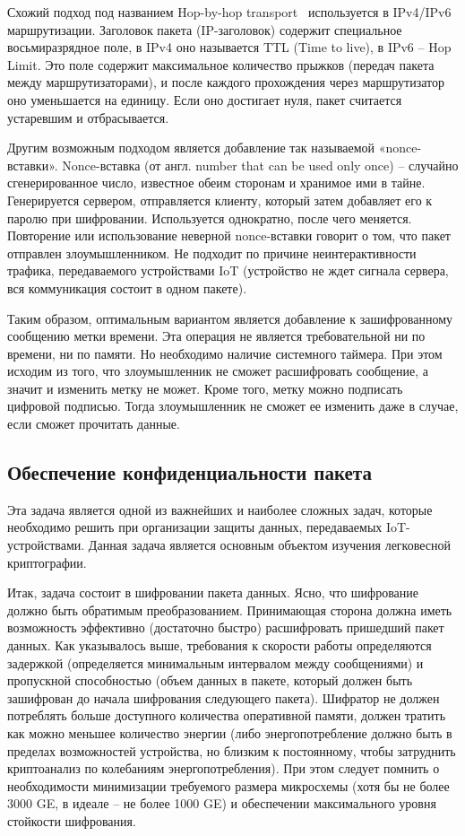Схожий подход под названием Hop-by-hop transport~\cite{src29} используется в IPv4/IPv6 маршрутизации. Заголовок пакета (IP-заголовок) содержит специальное восьмиразрядное поле, в IPv4 оно называется TTL (Time to live), в IPv6 – Hop Limit. Это поле содержит максимальное количество прыжков (передач пакета между маршрутизаторами), и после каждого прохождения через маршрутизатор оно уменьшается на единицу. Если оно достигает нуля, пакет считается устаревшим и отбрасывается.

Другим возможным подходом является добавление так называемой «nonce-вставки». Nonce-вставка (от англ. number that can be used only once) – случайно сгенерированное число, известное обеим сторонам и хранимое ими в тайне. Генерируется сервером, отправляется клиенту, который затем добавляет его к паролю при шифровании. Используется однократно, после чего меняется. Повторение или использование неверной nonce-вставки говорит о том, что пакет отправлен злоумышленником. Не подходит по причине неинтерактивности трафика, передаваемого устройствами IoT (устройство не ждет сигнала сервера, вся коммуникация состоит в одном пакете).

Таким образом, оптимальным вариантом является добавление к зашифрованному сообщению метки времени. Эта операция не является требовательной ни по времени, ни по памяти. Но необходимо наличие системного таймера. При этом исходим из того, что злоумышленник не сможет расшифровать сообщение, а значит и изменить метку не может. Кроме того, метку можно подписать цифровой подписью. Тогда злоумышленник не сможет ее изменить даже в случае, если сможет прочитать данные.

\subsection{Обеспечение конфиденциальности пакета}

Эта задача является одной из важнейших и наиболее сложных задач, которые необходимо решить при организации защиты данных, передаваемых IoT-устройствами. Данная задача является основным объектом изучения легковесной криптографии.

Итак, задача состоит в шифровании пакета данных. Ясно, что шифрование должно быть обратимым преобразованием. Принимающая сторона должна иметь возможность эффективно (достаточно быстро) расшифровать пришедший пакет данных. Как указывалось выше, требования к скорости работы определяются задержкой (определяется минимальным интервалом между сообщениями) и пропускной способностью (объем данных в пакете, который должен быть зашифрован до начала шифрования следующего пакета). Шифратор не должен потреблять больше доступного количества оперативной памяти, должен тратить как можно меньшее количество энергии (либо энергопотребление должно быть в пределах возможностей устройства, но близким к постоянному, чтобы затруднить криптоанализ по колебаниям энергопотребления). При этом следует помнить о необходимости минимизации требуемого размера микросхемы (хотя бы не более 3000 GE, в идеале – не более 1000 GE) и обеспечении максимального уровня стойкости шифрования.

